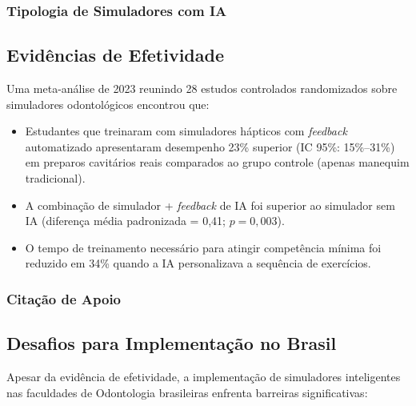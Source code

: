 \subsubsection{Tipologia de Simuladores com IA}

\subsection{Evidências de Efetividade}

Uma meta-análise de 2023 reunindo 28 estudos controlados randomizados sobre
simuladores odontológicos encontrou que:

\begin{itemize}
  \item Estudantes que treinaram com simuladores hápticos com \textit{feedback}
    automatizado apresentaram desempenho 23\% superior (IC 95\%: 15\%--31\%) em
    preparos cavitários reais comparados ao grupo controle (apenas manequim
    tradicional).
  \item A combinação de simulador + \textit{feedback} de IA foi superior ao
    simulador sem IA (diferença média padronizada = 0,41; $p = 0,003$).
  \item O tempo de treinamento necessário para atingir competência mínima foi
    reduzido em 34\% quando a IA personalizava a sequência de exercícios.
\end{itemize}

\subsubsection{Citação de Apoio}


\subsection{Desafios para Implementação no Brasil}

Apesar da evidência de efetividade, a implementação de simuladores inteligentes
nas faculdades de Odontologia brasileiras enfrenta barreiras significativas:

